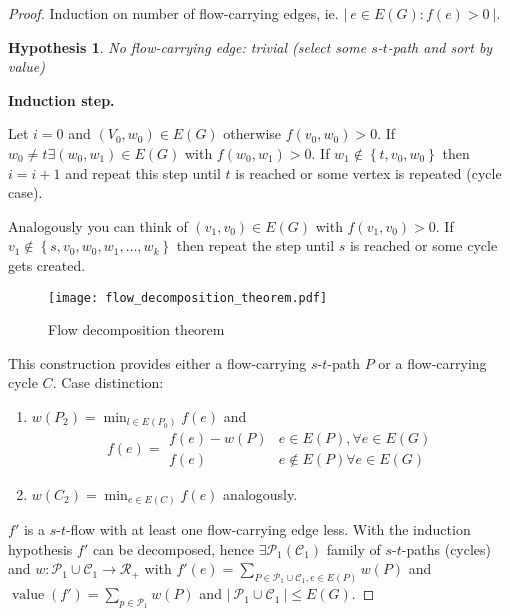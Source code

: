 \documentclass{article}
\newtheorem*{hypothesis}{Hypothesis}
\newcommand{\card}[1]{\left|\:\!#1\:\!\right|}
\newcommand{\set}[1]{\left\{#1\right\}}
\newcommand{\gath}[2]{$#1$-$#2$-path} %
\newcommand{\flow}[2]{$#1$-$#2$-flow}
\begin{document}
\begin{proof}
  Induction on number of flow-carrying edges, ie. $\card{ e \in E(G): f(e) > 0 }$. \\
  \begin{hypothesis}
    No flow-carrying edge: trivial (select some \gath st and sort by value)
  \end{hypothesis}
  \textbf{Induction step.}

  Let $i=0$ and $(V_0, w_0) \in E(G)$ otherwise $f(v_0, w_0) > 0$.
  If $w_0 \neq t \exists (w_0, w_1) \in E(G)$ with $f(w_0, w_1) > 0$.
  If $w_1 \notin \set{t, v_0, w_0}$ then $i = i + 1$ and repeat this step until $t$ is reached or some vertex is repeated (cycle case).

  Analogously you can think of $(v_1, v_0) \in E(G)$ with $f(v_1, v_0) > 0$. If $v_1 \notin \set{s, v_0, w_0, w_1, \ldots, w_k}$ then repeat the step until $s$ is reached or some cycle gets created.

  \begin{figure}[h]
   \begin{center}
    \texttt{[image: flow\_decomposition\_theorem.pdf]}
    \caption{Flow decomposition theorem}
   \end{center}
  \end{figure}

  This construction provides either a flow-carrying \gath st $P$ or a flow-carrying cycle $C$. Case distinction:
  \begin{enumerate}
    \item $w(P_2) = \min_{l \in E(P_0)} f(e)$ and \[
          f(e) = \begin{array}{lc}
            f(e) - w(P)  & e \in E(P), \forall e \in E(G) \\
            f(e)         & e \notin E(P) \forall e \in E(G)
          \end{array}\]
    \item $w(C_2) = \min_{e \in E(C)} f(e)$ analogously.
  \end{enumerate}

  $f'$ is a \flow st with at least one flow-carrying edge less.
  With the induction hypothesis $f'$ can be decomposed, hence $\exists \mathcal{P}_1(\mathcal{C}_1)$ family of \gath sts (cycles) and $w: \mathcal{P}_1 \cup \mathcal{C}_1 \rightarrow \mathcal{R}_+$ with $f'(e) = \sum_{P \in \mathcal{P}_1 \cup \mathcal{C}_1, e \in E(P)} w(P)$ and $\operatorname{value}(f') = \sum_{p \in \mathcal{P}_1} w(P)$ and $\card{\mathcal{P}_1 \cup \mathcal{C}_1} \leq E(G)$.


\end{proof}
\end{document}
